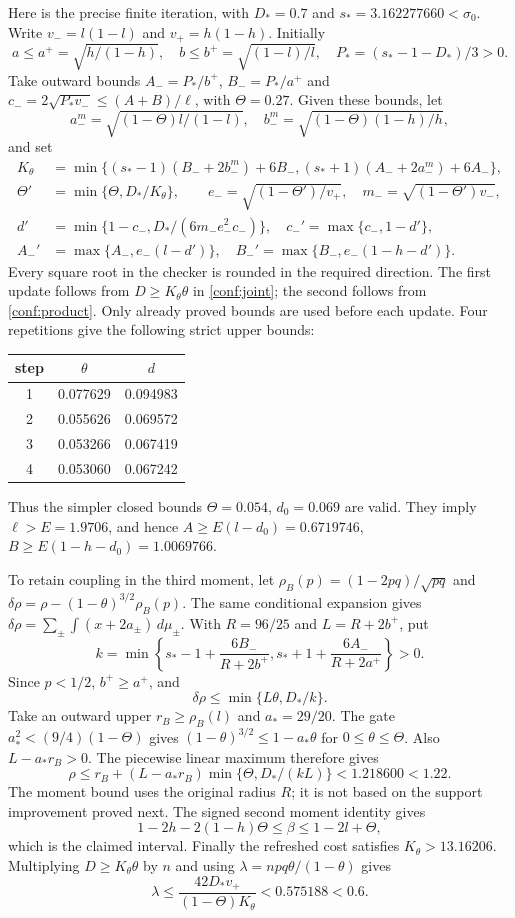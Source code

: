 \documentclass[11pt]{article}
\begin{document}
Here is the precise finite iteration, with $D_*=0.7$ and
$s_*=3.162277660<\sigma_0$. Write
$v_-=l(1-l)$ and $v_+=h(1-h)$.
Initially
\[
 a\le a^+=\sqrt{h/(1-h)},\quad b\le b^+=\sqrt{(1-l)/l},\quad
 P_*=(s_*-1-D_*)/3>0.
\]
Take outward bounds
$A_-=P_*/b^+$, $B_-=P_*/a^+$ and
$c_-=2\sqrt{P_*v_-}\le(A+B)/\ell$, with $\Theta=0.27$.
Given these bounds, let
\[
 a_-^m=\sqrt{(1-\Theta)l/(1-l)},\quad
 b_-^m=\sqrt{(1-\Theta)(1-h)/h},
\]
and set
\begin{align*}
 K_\theta&=\min\{(s_*-1)(B_-+2b_-^m)+6B_-,
                    (s_*+1)(A_-+2a_-^m)+6A_-\},\\
 \Theta'&=\min\{\Theta,D_*/K_\theta\},\qquad
 e_- =\sqrt{(1-\Theta')/v_+},\quad m_- =\sqrt{(1-\Theta')v_-},\\
 d'&=\min\{1-c_-,D_*/(6m_-e_-^2c_-)\},\quad c_-'=\max\{c_-,1-d'\},\\
 A_-'&=\max\{A_-,e_-(l-d')\},\quad
 B_-'=\max\{B_-,e_-(1-h-d')\}.
\end{align*}
Every square root in the checker is rounded in the required direction.
The first update follows from $D\ge K_\theta\theta$ in
\eqref{conf:joint}; the second follows from \eqref{conf:product}.
Only already proved bounds are used before each update. Four repetitions give
the following strict upper bounds:
\begin{center}
\begin{tabular}{ccc}\toprule
step&$\theta$&$d$\\\midrule
1&0.077629&0.094983\\
2&0.055626&0.069572\\
3&0.053266&0.067419\\
4&0.053060&0.067242\\\bottomrule
\end{tabular}
\end{center}
Thus the simpler closed bounds $\Theta=0.054$, $d_0=0.069$ are valid.
They imply $\ell>E=1.9706$, and hence
$A\ge E(l-d_0)=0.6719746$, $B\ge E(1-h-d_0)=1.0069766$.

To retain coupling in the third moment, let
$\rho_B(p)=(1-2pq)/\sqrt{pq}$ and
$\delta\rho=\rho-(1-\theta)^{3/2}\rho_B(p)$.
The same conditional expansion gives
$\delta\rho=\sum_\pm\int(x+2a_\pm)\,d\mu_\pm$.
With $R=96/25$ and $L=R+2b^+$, put
\[
 k=\min\left\{s_*-1+\frac{6B_-}{R+2b^+},
                 s_*+1+\frac{6A_-}{R+2a^+}\right\}>0.
\]
Since $p<1/2$, $b^+\ge a^+$, and
\[
                 \delta\rho\le\min\{L\theta,D_*/k\}.
\]
Take an outward upper $r_B\ge\rho_B(l)$ and $a_*=29/20$.
The gate $a_*^2<(9/4)(1-\Theta)$ gives
$(1-\theta)^{3/2}\le1-a_*\theta$ for $0\le\theta\le\Theta$.
Also $L-a_*r_B>0$. The piecewise linear maximum therefore gives
\[
 \rho\le r_B+(L-a_*r_B)\min\{\Theta,D_*/(kL)\}
                 <1.218600<1.22.
\]
The moment bound uses the original radius $R$; it is not based on the
support improvement proved next. The signed second moment identity gives
\[
 1-2h-2(1-h)\Theta\le\beta\le1-2l+\Theta,
\]
which is the claimed interval. Finally the refreshed cost satisfies
$K_\theta>13.16206$. Multiplying $D\ge K_\theta\theta$ by $n$ and using
$\lambda=npq\theta/(1-\theta)$ gives
\[
 \lambda\le\frac{42D_*v_+}{(1-\Theta)K_\theta}<0.575188<0.6.
\]
\end{document}
